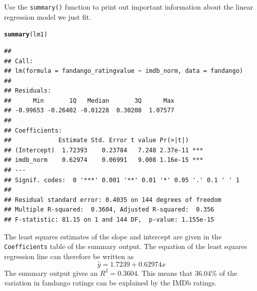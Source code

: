 \documentclass[11pt]{article}\usepackage[]{graphicx}\usepackage[]{color}
\makeatletter
\newcommand{\hlstd}[1]{\textcolor[rgb]{0.345,0.345,0.345}{#1}}%
\newcommand{\hlkwd}[1]{\textcolor[rgb]{0.737,0.353,0.396}{\textbf{#1}}}%
\newenvironment{kframe}{%
 \def\at@end@of@kframe{}%
 \ifinner\ifhmode%
  \def\at@end@of@kframe{\end{minipage}}%
  \begin{minipage}{\columnwidth}%
 \fi\fi%
 \def\FrameCommand##1{\hskip\@totalleftmargin \hskip-\fboxsep
 \colorbox{shadecolor}{##1}\hskip-\fboxsep
     \hskip-\linewidth \hskip-\@totalleftmargin \hskip\columnwidth}%
 \MakeFramed {\advance\hsize-\width
   \@totalleftmargin\z@ \linewidth\hsize
   \@setminipage}}%
 {\par\unskip\endMakeFramed%
 \at@end@of@kframe}
\newenvironment{knitrout}{}{} %
\makeatother
\begin{document}
Use the \texttt{summary()} function to print out important information about the linear regression model we just fit.
\begin{knitrout}
\color{fgcolor}\begin{kframe}
\begin{alltt}
\hlkwd{summary}\hlstd{(lm1)}
\end{alltt}
\begin{verbatim}
## 
## Call:
## lm(formula = fandango_ratingvalue ~ imdb_norm, data = fandango)
## 
## Residuals:
##      Min       1Q   Median       3Q      Max 
## -0.99653 -0.26402 -0.01228  0.30208  1.07577 
## 
## Coefficients:
##             Estimate Std. Error t value Pr(>|t|)    
## (Intercept)  1.72393    0.23784   7.248 2.37e-11 ***
## imdb_norm    0.62974    0.06991   9.008 1.16e-15 ***
## ---
## Signif. codes:  0 '***' 0.001 '**' 0.01 '*' 0.05 '.' 0.1 ' ' 1
## 
## Residual standard error: 0.4035 on 144 degrees of freedom
## Multiple R-squared:  0.3604,	Adjusted R-squared:  0.356 
## F-statistic: 81.15 on 1 and 144 DF,  p-value: 1.155e-15
\end{verbatim}
\end{kframe}
\end{knitrout}
\clearpage

The least squares estimates of the slope and intercept are given in the \texttt{Coefficients} table of the summary output.  The equation of the least squares regression line can therefore be written as
$$\hat{y} =  1.7239 + 0.62974x$$
The summary output gives an $R^2 = 0.3604$.  This means that 36.04\% of the variation in fandango ratings can be explained by the IMDb ratings.\\
\end{document}
